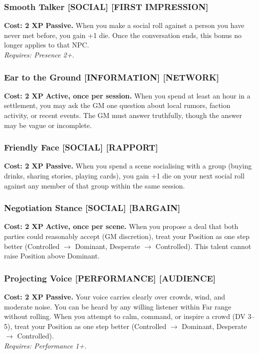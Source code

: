\subsubsection*{Smooth Talker \textnormal{[SOCIAL] [FIRST IMPRESSION]}}
\label{talent:smooth-talker}
\textbf{Cost: 2 XP} \textbf{Passive.} When you make a social roll against a person you have never met before, you gain +1 die. Once the conversation ends, this bonus no longer applies to that NPC. \\
\textit{Requires: Presence 2+.}

\subsubsection*{Ear to the Ground \textnormal{[INFORMATION] [NETWORK]}}
\label{talent:ear-to-the-ground}
\textbf{Cost: 2 XP} \textbf{Active, once per session.} When you spend at least an hour in a settlement, you may ask the GM one question about local rumors, faction activity, or recent events. The GM must answer truthfully, though the answer may be vague or incomplete.

\subsubsection*{Friendly Face \textnormal{[SOCIAL] [RAPPORT]}}
\label{talent:friendly-face}
\textbf{Cost: 2 XP} \textbf{Passive.} When you spend a scene socialising with a group (buying drinks, sharing stories, playing cards), you gain +1 die on your next social roll against any member of that group within the same session.

\subsubsection*{Negotiation Stance \textnormal{[SOCIAL] [BARGAIN]}}
\label{talent:negotiation-stance}
\textbf{Cost: 2 XP} \textbf{Active, once per scene.} When you propose a deal that both parties could reasonably accept (GM discretion), treat your Position as one step better (Controlled $\rightarrow$ Dominant, Desperate $\rightarrow$ Controlled). This talent cannot raise Position above Dominant.

\subsubsection*{Projecting Voice \textnormal{[PERFORMANCE] [AUDIENCE]}}
\label{talent:projecting-voice}
\textbf{Cost: 2 XP} \textbf{Passive.} Your voice carries clearly over crowds, wind, and moderate noise. You can be heard by any willing listener within Far range without rolling. When you attempt to calm, command, or inspire a crowd (DV 3--5), treat your Position as one step better (Controlled $\rightarrow$ Dominant, Desperate $\rightarrow$ Controlled). \\
\textit{Requires: Performance 1+.}

